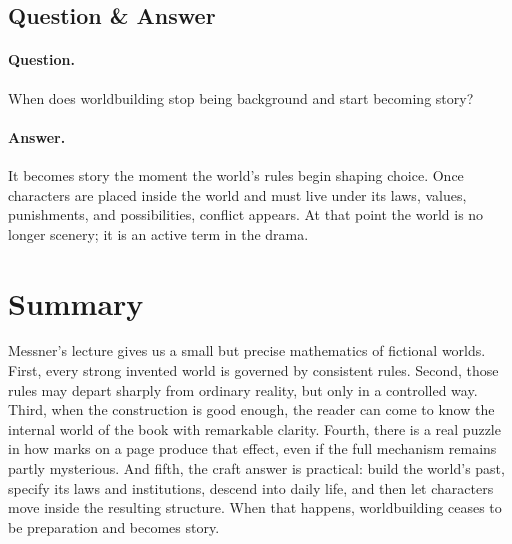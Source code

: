 \subsection{Question \& Answer}

\paragraph{Question.} When does worldbuilding stop being background and start becoming story?

\paragraph{Answer.} It becomes story the moment the world's rules begin shaping choice. Once characters are placed inside the world and must live under its laws, values, punishments, and possibilities, conflict appears. At that point the world is no longer scenery; it is an active term in the drama.

\section{Summary}

Messner's lecture gives us a small but precise mathematics of fictional worlds. First, every strong invented world is governed by consistent rules. Second, those rules may depart sharply from ordinary reality, but only in a controlled way. Third, when the construction is good enough, the reader can come to know the internal world of the book with remarkable clarity. Fourth, there is a real puzzle in how marks on a page produce that effect, even if the full mechanism remains partly mysterious. And fifth, the craft answer is practical: build the world's past, specify its laws and institutions, descend into daily life, and then let characters move inside the resulting structure. When that happens, worldbuilding ceases to be preparation and becomes story.